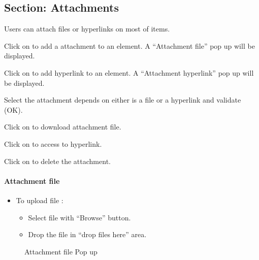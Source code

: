 \documentclass[letterpaper,10pt,english]{sphinxmanual}
\begin{document}
\subsection{Section: Attachments}
\label{Gui:index-4}\label{Gui:gui-attachment-section-label}\label{Gui:section-attachments}
Users can attach files or hyperlinks on most of items.

Click on  to add a attachment to an element. A “Attachment file” pop up will be displayed.

Click on  to add hyperlink to an element. A “Attachment hyperlink” pop up will be displayed.

Select the attachment depends on either is a file or a hyperlink and validate (OK).

Click on  to download attachment file.

Click on  to access to hyperlink.

Click on  to delete the attachment.
\paragraph{Attachment file}
\begin{itemize}
\item {} 
To upload file :
\begin{itemize}
\item {} 
Select file with ``Browse'' button.

\item {} 
Drop the file in ``drop files here'' area.

\end{itemize}

\end{itemize}
\begin{figure}[htbp]
\centering
\capstart

\caption{Attachment file Pop up}\end{figure}
\end{document}
